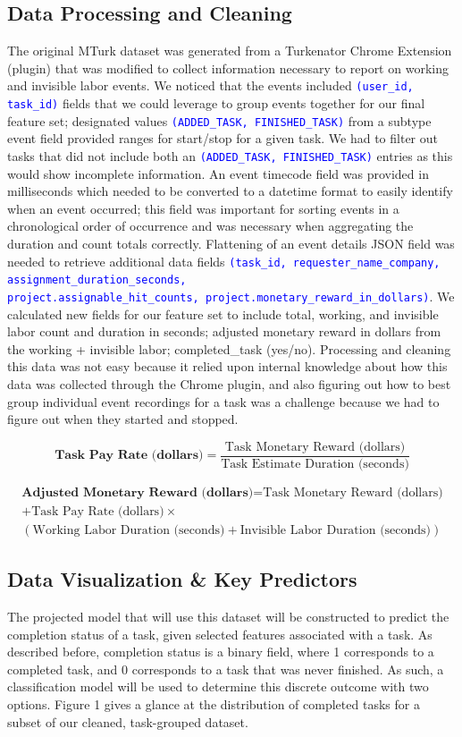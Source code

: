 \documentclass[11pt]{article}
\newcommand{\codeword}[1]{\texttt{\textcolor{blue}{#1}}}
\begin{document}
\subsection{Data Processing and Cleaning}
The original MTurk dataset was generated from a Turkenator Chrome Extension (plugin) that was modified to collect information necessary to report on working and invisible labor events. We noticed that the events included \codeword{(user\_id, task\_id)} fields that we could leverage to group events together for our final feature set; designated values \codeword{(ADDED\_TASK, FINISHED\_TASK)} from a subtype event field provided ranges for start/stop for a given task. We had to filter out tasks that did not include both an \codeword{(ADDED\_TASK, FINISHED\_TASK)} entries as this would show incomplete information. An event timecode field was provided in milliseconds which needed to be converted to a datetime format to easily identify when an event occurred; this field was important for sorting events in a chronological order of occurrence and was necessary when aggregating the duration and count totals correctly. Flattening of an event details JSON field was needed to retrieve additional data fields \codeword{(task\_id, requester\_name\_company, assignment\_duration\_seconds, \\project.assignable\_hit\_counts, project.monetary\_reward\_in\_dollars)}. We calculated new fields for our feature set to include total, working, and invisible labor count and duration in seconds; adjusted monetary reward in dollars from the working + invisible labor; completed\_task (yes/no). Processing and cleaning this data was not easy because it relied upon internal knowledge about how this data was collected through the Chrome plugin, and also figuring out how to best group individual event recordings for a task was a challenge because we had to figure out when they started and stopped.

$$\textbf{Task Pay Rate (dollars)} = \frac{\text{Task Monetary Reward (dollars)}}{\text{Task Estimate Duration (seconds)}}$$

\begin{multline*}
\textbf{Adjusted Monetary Reward (dollars)} = \text{Task Monetary Reward (dollars)} \\ + \text{Task Pay Rate (dollars)} \times \\ (\text{Working Labor Duration (seconds)} + \text{Invisible Labor Duration (seconds)})
\end{multline*}

\subsection{Data Visualization \& Key Predictors}
The projected model that will use this dataset will be constructed to predict the completion status of a task, given selected features associated with a task. As described before, completion status is a binary field, where 1 corresponds to a completed task, and 0 corresponds to a task that was never finished. As such, a classification model will be used to determine this discrete outcome with two options. Figure 1 gives a glance at the distribution of completed tasks for a subset of our cleaned, task-grouped dataset.
\end{document}
